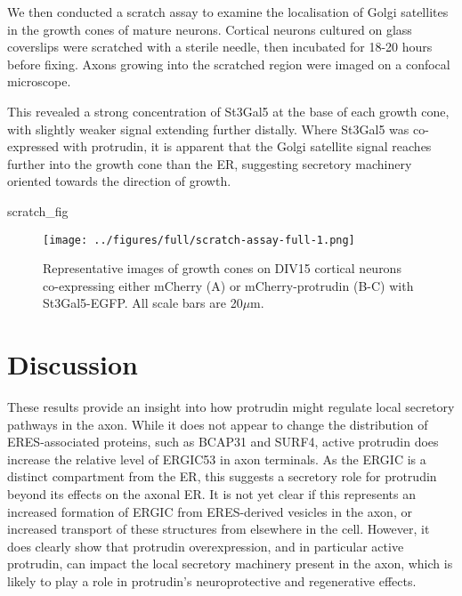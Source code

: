 \documentclass[
  12pt,
  a4paper,
]{book}
\newenvironment{Shaded}{\begin{snugshade}}{\end{snugshade}}
\newcommand{\NormalTok}[1]{#1}
\begin{document}
We then conducted a scratch assay to examine the localisation of Golgi satellites in the growth cones of mature neurons. Cortical neurons cultured on glass coverslips were scratched with a sterile needle, then incubated for 18-20 hours before fixing. Axons growing into the scratched region were imaged on a confocal microscope.

This revealed a strong concentration of St3Gal5 at the base of each growth cone, with slightly weaker signal extending further distally. Where St3Gal5 was co-expressed with protrudin, it is apparent that the Golgi satellite signal reaches further into the growth cone than the ER, suggesting secretory machinery oriented towards the direction of growth.

\begin{Shaded}
\begin{Highlighting}[]
\NormalTok{scratch\_fig}
\end{Highlighting}
\end{Shaded}

\begin{figure}
\centering
\texttt{[image: ../figures/full/scratch-assay-full-1.png]}
\caption{\label{fig:scratch-assay-full}Representative images of growth cones on DIV15 cortical neurons co-expressing either mCherry (A) or mCherry-protrudin (B-C) with St3Gal5-EGFP. All scale bars are 20\(\mu\)m.}
\end{figure}

\hypertarget{discussion-1}{%
\section{Discussion}\label{discussion-1}}

These results provide an insight into how protrudin might regulate local secretory pathways in the axon. While it does not appear to change the distribution of ERES-associated proteins, such as BCAP31 and SURF4, active protrudin does increase the relative level of ERGIC53 in axon terminals. As the ERGIC is a distinct compartment from the ER, this suggests a secretory role for protrudin beyond its effects on the axonal ER. It is not yet clear if this represents an increased formation of ERGIC from ERES-derived vesicles in the axon, or increased transport of these structures from elsewhere in the cell. However, it does clearly show that protrudin overexpression, and in particular active protrudin, can impact the local secretory machinery present in the axon, which is likely to play a role in protrudin's neuroprotective and regenerative effects.
\end{document}
